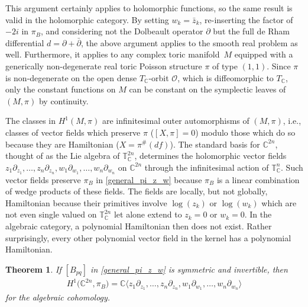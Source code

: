\documentclass[10pt,a4paper]{amsart}
\numberwithin{equation}{section}
\newtheorem{Theorem}{Theorem}[section]
\begin{document}
This argument certainly applies to holomorphic functions, so the same result is valid in the holomorphic category. By setting $w_k=\bar{z}_k$, re-inserting the factor of $-2i$ in $\pi_B$, and considering not the Dolbeault operator $\partial$ but the full de Rham dif\/ferential $d=\partial+\bar{\partial}$, the above argument applies to the smooth real problem as well. Furthermore, it applies to any complex toric mani\-fold~$M$ equipped with a generically non-degenerate real toric Poisson structure $\pi$ of type $(1,1)$. Since $\pi$ is non-degenerate on the open dense $T_{\mathbb C}$-orbit $\mathcal O$, which is dif\/feomorphic to $T_{\mathbb C}$, only the constant functions on $M$ can be constant on the symplectic leaves of $(M,\pi)$ by continuity.

The classes in $H^1(M,\pi)$ are inf\/initesimal outer automorphisms of $(M,\pi)$, i.e., classes of vector f\/ields which preserve $\pi$ ($[X,\pi]=0$) modulo those which do so because they are Hamiltonian ($X=\pi^\#(df)$). The standard basis for ${\mathbb C}^{2n}$, thought of as the Lie algebra of ${\mathbb T}_{\mathbb C}^{2n}$, determines the holomorphic vector f\/ields $z_1\partial_{z_1},\dots,z_n\partial_{z_n},w_1\partial_{w_1},\dots,w_n\partial_{w_n}$ on ${\mathbb C}^{2n}$ through the inf\/initesimal action of $\mathbb T_{\mathbb C}^n$. Such vector f\/ields preserve $\pi_B$ in \eqref{general_pi_z_w} because $\pi_B$ is a linear combination of wedge products of these f\/ields. The f\/ields are locally, but not globally, Hamiltonian because their primitives involve $\log(z_k)$ or $\log(w_k)$ which are not even single valued on ${\mathbb T}_{\mathbb C}^{2n}$ let alone extend to $z_k=0$ or $w_k=0$. In the algebraic category, a polynomial Hamiltonian then does not exist. Rather surprisingly, every other polynomial vector f\/ield in the kernel has a polynomial Hamiltonian.


\begin{Theorem}\label{BeritsH1theorem}
If $[B_{pq}]$ in \eqref{general_pi_z_w} is symmetric and invertible, then
\begin{gather*}
H^1\big({\mathbb C}^{2n},\pi_B\big)={\mathbb C}\langle z_1\partial_{z_1},\dots,z_n\partial_{z_n},w_1\partial_{w_1},\dots,w_n\partial_{w_n}\rangle
\end{gather*}
for the algebraic cohomology.
\end{Theorem}
\end{document}
